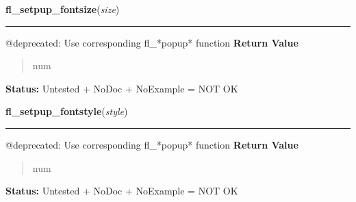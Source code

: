     \label{xformslib:deprecated:fl_setpup_default_fontsize}

    \vspace{0.5ex}

\hspace{.8\funcindent}\begin{boxedminipage}{\funcwidth}

    \raggedright \textbf{fl\_setpup\_fontsize}(\textit{size})

    \vspace{-1.5ex}

    \rule{\textwidth}{0.5\fboxrule}
\setlength{\parskip}{2ex}

@deprecated: Use corresponding fl\_*popup* function
\setlength{\parskip}{1ex}
      \textbf{Return Value}
    \vspace{-1ex}

      \begin{quote}

num
      \end{quote}

\textbf{Status:} 
Untested + NoDoc + NoExample = NOT OK


    \end{boxedminipage}

    \label{xformslib:deprecated:fl_setpup_default_fontstyle}

    \vspace{0.5ex}

\hspace{.8\funcindent}\begin{boxedminipage}{\funcwidth}

    \raggedright \textbf{fl\_setpup\_fontstyle}(\textit{style})

    \vspace{-1.5ex}

    \rule{\textwidth}{0.5\fboxrule}
\setlength{\parskip}{2ex}

@deprecated: Use corresponding fl\_*popup* function
\setlength{\parskip}{1ex}
      \textbf{Return Value}
    \vspace{-1ex}

      \begin{quote}

num
      \end{quote}

\textbf{Status:} 
Untested + NoDoc + NoExample = NOT OK


    \end{boxedminipage}

